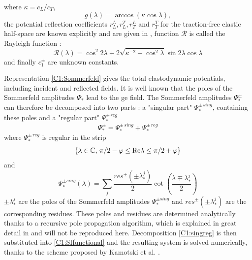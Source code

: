 where $\kappa=c_L/c_T$,
\begin{equation}
g(\lambda)=\arccos(\kappa\cos\lambda),
\end{equation}
the potential reflection coefficients $r_L^L,r_L^T,r_T^L$ and $r_T^T$ for the traction-free elastic half-space are known explicitly and are given in \cite{KamotskiFradkin}, function $\mathcal{R}$ is called the Rayleigh function :
\begin{equation}
\mathcal{R}(\lambda)=\cos^2 2\lambda+2\sqrt{\kappa^{-2}-\cos^2\lambda}\sin 2\lambda \cos\lambda
\label{C1:defRayleigh}
\end{equation}
and finally $c_1^\pm$ are unknown constants.

Representation \eqref{C1:Sommerfeld} gives the total elastodynamic potentials, including incident and reflected fields. It is well known that the poles of the Sommerfeld amplitudes $\Psi_*$ lead to the \acrshort{ge} field. The Sommerfeld amplitudes $\Psi_*^\pm$ can therefore be decomposed into two parts : a "singular part" $\Psi_*^{\pm \, sing}$, containing these poles and a "regular part" $\Psi_*^{\pm \, reg}$
\begin{equation}
\Psi_*^\pm=\Psi_*^{\pm \, sing}+\Psi_*^{\pm \, reg}
\label{C1:singreg}
\end{equation}
where $\Psi_*^{\pm \, reg}$ is regular in the strip 
\begin{equation}
\{ \lambda \in \mathbb{C},\, \pi/2-\varphi \leq \rm Re \lambda \leq \pi/2+\varphi \}
\end{equation}
and
\begin{equation}
\Psi_*^{\pm sing}(\lambda)=\sum_j \dfrac{res^\pm(\pm \lambda_*^j)}{2}\cot\left(\dfrac{\lambda\mp\lambda_*^j}{2}\right)
\end{equation}
$\pm\lambda_*^j$ are the poles of the Sommerfeld amplitudes $\Psi_*^{\pm sing}$ and  $res^\pm(\pm \lambda_*^j)$ are the corresponding residues. These poles and residues are determined analytically thanks to a recursive pole propagation algorithm, which is explained in great detail in \cite{AKDthese} and will not be reproduced here. Decomposition \eqref{C1:singreg} is then substituted into \eqref{C1:SIfunctional} and the resulting system is solved numerically, thanks to the scheme proposed by Kamotski et al. \cite{KamotskiFradkin}.

